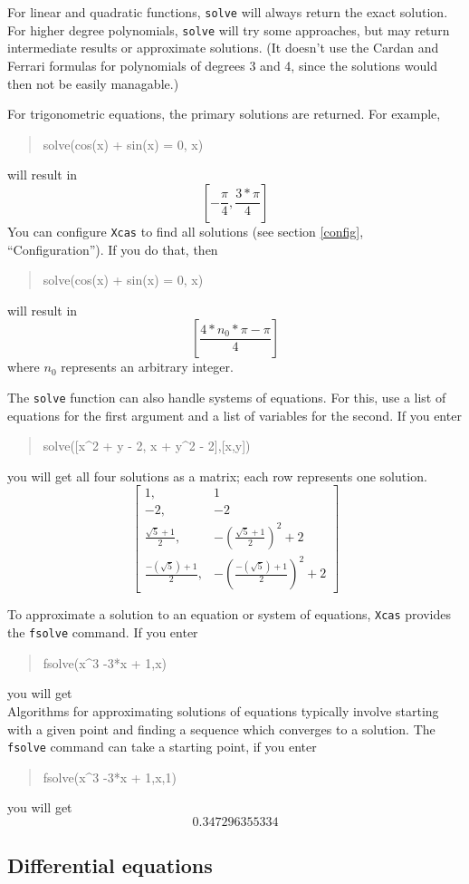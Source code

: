 \documentclass{article}
\newcommand{\xcasin}[1]
{\begin{quote}\ttfamily
#1
\end{quote}}
\newcommand{\xcasout}[1]
{\begin{equation*}
#1
\end{equation*}}
\begin{document}
For linear and quadratic functions, \texttt{solve} will always return
the exact solution.  For higher degree polynomials, \texttt{solve}
will try some approaches, but may return intermediate results or
approximate solutions.  (It doesn't use the Cardan and Ferrari
formulas for polynomials of degrees 3 and 4, since the solutions would
then not be easily managable.)

For trigonometric equations, the primary solutions are returned.  For
example,
\xcasin{solve(cos(x) + sin(x) = 0, x)}
will result in
\xcasout{\left[-\frac{\pi}{4},\frac{3*\pi}{4}\right]}
You can configure \texttt{Xcas} to find all solutions (see section
\ref{config}, ``Configuration'').  If you do that, then
\xcasin{solve(cos(x) + sin(x) = 0, x)}
will result in
\xcasout{\left[\frac{4*n_0*\pi-\pi}{4}\right]}
where $n_0$ represents an arbitrary integer.

The \texttt{solve} function can also handle systems of equations.
For this, use a list of equations for the first argument and a list of
variables for the second.  If you enter
\xcasin{solve([x\^{}2 + y - 2, x + y\^{}2 - 2],[x,y])}
you will get all four solutions as a matrix; each row represents one
solution.
\xcasout{
\left[\begin{matrix}1,& 1\\ -2,& -2\\ \frac{\sqrt{5}+1}{2}, &
-\left(\frac{\sqrt{5}+1}{2}\right)^2 + 2\\
\frac{-(\sqrt{5})+1}{2}, &
-\left(\frac{-(\sqrt{5})+1}{2}\right)^2 + 2
\end{matrix}\right]}

To approximate a solution to an equation or system of equations,
\texttt{Xcas} provides the \texttt{fsolve} command.  If you enter
\xcasin{fsolve(x\^{}3 -3*x + 1,x)}
you will get
\xcasout{[-1.87938524157,0.347296355334,1.53208888624]}
Algorithms for approximating solutions of equations 
typically involve starting with a given point and finding a sequence
which converges to a solution.  The \texttt{fsolve} command can take
a starting point, if you enter
\xcasin{fsolve(x\^{}3 -3*x + 1,x,1)}
you will get
\xcasout{0.347296355334}


\subsection{Differential equations}
\end{document}
